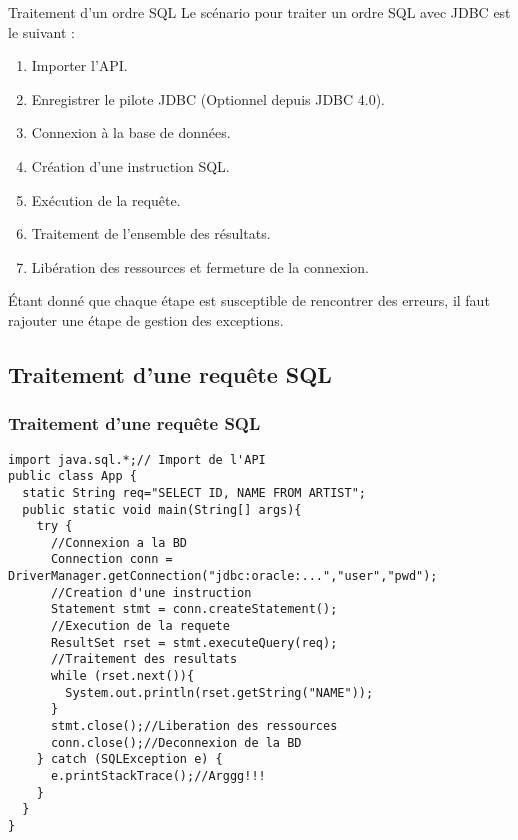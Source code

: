 \documentclass[xcolor=pdftex,x11names,table]{beamer}
\begin{document}
    \begin{frame}{Traitement d’un ordre SQL}
      Le scénario pour traiter un ordre SQL avec JDBC est le suivant :
      \begin{enumerate}
        \item Importer l'API.
        \item Enregistrer le pilote JDBC (Optionnel depuis JDBC 4.0).
        \item Connexion à la base de données.
        \item Création d’une instruction SQL.
        \item Exécution de la requête.
        \item Traitement de l’ensemble des résultats.
        \item Libération des ressources et fermeture de la connexion.
      \end{enumerate}
      Étant donné que chaque étape est susceptible de rencontrer des erreurs, 
      il faut rajouter une étape de gestion des exceptions.
    \end{frame}
		\lstset{basicstyle=\scriptsize,language=Java}
		
    \subsection{Traitement d’une requête SQL}
    
    \begin{frame}[fragile]
			\frametitle{Traitement d’une requête SQL}
			\begin{lstlisting}
import java.sql.*;// Import de l'API
public class App {
  static String req="SELECT ID, NAME FROM ARTIST";
  public static void main(String[] args){
    try {
      //Connexion a la BD
      Connection conn = DriverManager.getConnection("jdbc:oracle:...","user","pwd");
      //Creation d'une instruction
      Statement stmt = conn.createStatement();
      //Execution de la requete
      ResultSet rset = stmt.executeQuery(req);
      //Traitement des resultats
      while (rset.next()){
        System.out.println(rset.getString("NAME"));
      }
      stmt.close();//Liberation des ressources
      conn.close();//Deconnexion de la BD
    } catch (SQLException e) {
      e.printStackTrace();//Arggg!!!
    }
  }
}
			\end{lstlisting}
		\end{frame}
		
\end{document}
